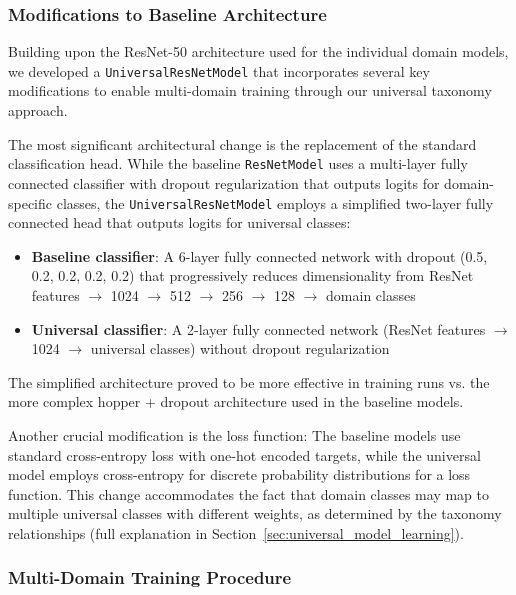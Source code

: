 \subsubsection{Modifications to Baseline Architecture}

Building upon the ResNet-50 architecture used for the individual domain models, we developed a \texttt{UniversalResNetModel} that incorporates several key modifications to enable multi-domain training through our universal taxonomy approach.

The most significant architectural change is the replacement of the standard classification head. While the baseline \texttt{ResNetModel} uses a multi-layer fully connected classifier with dropout regularization that outputs logits for domain-specific classes, the \texttt{UniversalResNetModel} employs a simplified two-layer fully connected head that outputs logits for universal classes:

\begin{itemize}
      \item \textbf{Baseline classifier}: A 6-layer fully connected network with dropout (0.5, 0.2, 0.2, 0.2, 0.2) that progressively reduces dimensionality from ResNet features $\rightarrow$ 1024 $\rightarrow$ 512 $\rightarrow$ 256 $\rightarrow$ 128 $\rightarrow$ domain classes
      \item \textbf{Universal classifier}: A 2-layer fully connected network (ResNet features $\rightarrow$ 1024 $\rightarrow$ universal classes) without dropout regularization
\end{itemize}

The simplified architecture proved to be more effective in training runs vs. the more complex hopper + dropout architecture used in the baseline models.

Another crucial modification is the loss function:
The baseline models use standard cross-entropy loss with one-hot encoded targets,
while the universal model employs cross-entropy for discrete probability distributions for a loss function.
This change accommodates the fact that domain classes may map to multiple universal classes with different weights,
as determined by the taxonomy relationships
(full explanation in Section~\ref{sec:universal_model_learning}).

\subsubsection{Multi-Domain Training Procedure}

